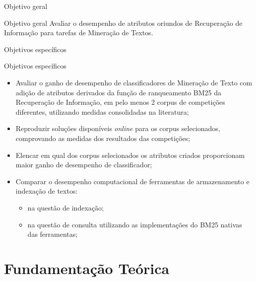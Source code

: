 \documentclass[%
  10pt,%
  aspectratio = 169,%
  compress,%
  t,%
]{beamer}%
\begin{document}
    \begin{frame}{}{Objetivo geral}

        \begin{block}{Objetivo geral}
            Avaliar o desempenho de atributos oriundos de Recuperação de Informação para tarefas de Mineração de Textos.
        \end{block}
    \end{frame}

    \begin{frame}{}{Objetivos específicos}
        \begin{block}{Objetivos específicos}
            \begin{itemize}
        	\item Avaliar o ganho de desempenho de classificadores de Mineração de Texto com adição de atributos derivados da função de ranqueamento BM25 da Recuperação de Informação, em pelo menos 2 corpus de competições diferentes, utilizando medidas consolidadas na literatura;

        	\item Reproduzir soluções disponíveis \textit{online} para os corpus selecionados, comprovando as medidas dos resultados das competições;

            \item Elencar em qual dos corpus selecionados os atributos criados proporcionam maior ganho de desempenho de classificador;

            \item Comparar o desempenho computacional de ferramentas de armazenamento e indexação de textos:
            \begin{itemize}
                \item na questão de indexação;
                \item na questão de consulta utilizando as implementações do BM25 nativas das ferramentas;
            \end{itemize}

            \end{itemize}
        \end{block}
    \end{frame}


\section{Fundamentação Teórica}\label{sec:fundamentação-teórica}
\end{document}
